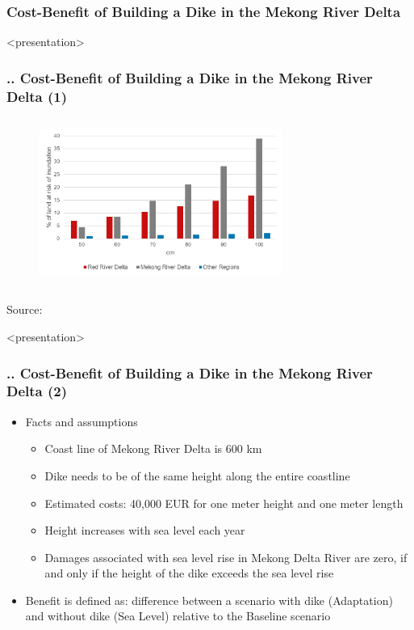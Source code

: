 \documentclass[11pt,aspectratio=169]{beamer}
\begin{document}
\subsubsection{Cost-Benefit of Building a Dike in the Mekong River Delta}
\begin{frame}<presentation>
	\frametitle{{\thesection.\thesubsection.\thesubsubsection} Cost-Benefit of Building a Dike in the Mekong River Delta (1)}
	\begin{figure}
	\includegraphics[width=8cm,height=5.5cm]{pictures/Sea_Level_Rise_Vietnam}
	\end{figure}
	{\footnotesize Source: \cite{thuc2016climate}}
\end{frame}

\begin{frame}<presentation>
	\frametitle{{\thesection.\thesubsection.\thesubsubsection} Cost-Benefit of Building a Dike in the Mekong River Delta (2)}
	\begin{itemize}
		\item Facts and assumptions 
		\begin{itemize}
			\item Coast line of Mekong River Delta is 600 km
			\item Dike needs to be of the same height along the entire coastline
			\item Estimated costs: 40,000 EUR for one meter height and one meter length 
			\item Height increases with sea level each year
			\item Damages associated with sea level rise in Mekong Delta River are zero, if and only if the height of the dike exceeds the sea level rise
		\end{itemize}	
		\item Benefit is defined as: difference between a scenario with dike (Adaptation) and without dike (Sea Level) relative to the Baseline scenario
	\end{itemize}
\end{frame}
\end{document}

